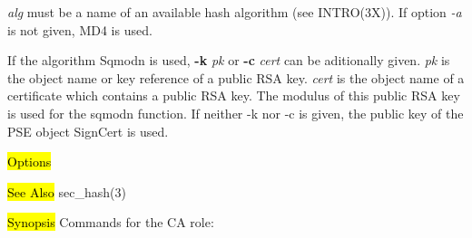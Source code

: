 {\em alg} must be a name of an available hash algorithm (see INTRO(3X)). If option
{\em -a} is not given, MD4 is used.

If the algorithm Sqmodn is used, {\bf -k} {\em pk} or {\bf -c} {\em cert}
can be aditionally given. {\em pk} is the object name or key reference of a public RSA key.
{\em cert} is the object name of a certificate which contains a public RSA
key. The modulus of this public RSA key is used for the sqmodn function. If neither -k nor -c
is given, the public key of the PSE object SignCert is used. 

\hl{Options}


  
 
\hl{See Also}
sec\_hash(3)

\label{km}
\hl{Synopsis}
Commands for the CA role:

